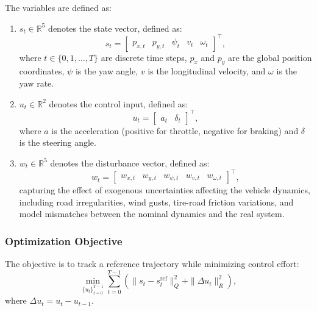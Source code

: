 \documentclass[pdflatex,sn-mathphys,Numbered]{sn-jnl}
\numberwithin{equation}{section}
\begin{document}
	The variables are defined as:
	\begin{enumerate}
		\item[i)] \( s_t \in \mathbb{R}^5 \) denotes the state vector, defined as:
		\begin{equation}
			s_t = \begin{bmatrix} p_{x,t} & p_{y,t} & \psi_t & v_t & \omega_t \end{bmatrix}^\top,
			\label{equ:sec2_state_vector}
		\end{equation}
		where \(t \in \{0,1,\dots,T\}\) are discrete time steps, \( p_x \) and \( p_y \) are the global position coordinates, \( \psi \) is the yaw angle, \( v \) is the longitudinal velocity, and \( \omega \) is the yaw rate.
		
		\item[ii)] \( u_t \in \mathbb{R}^2 \) denotes the control input, defined as:
		\begin{equation}
			u_t = \begin{bmatrix} a_t & \delta_t \end{bmatrix}^\top,
			\label{equ:sec2_control_vector}
		\end{equation}
		where \( a \) is the acceleration (positive for throttle, negative for braking) and \( \delta \) is the steering angle.
		
		\item[iii)] \( w_t \in \mathbb{R}^5 \) denotes the disturbance vector, defined as:
		\begin{equation}
			w_t = \begin{bmatrix} w_{x,t} & w_{y,t} & w_{\psi,t} & w_{v,t} & w_{\omega,t} \end{bmatrix}^\top,
			\label{equ:sec2_disturbance_vector}
		\end{equation}
		capturing the effect of exogenous uncertainties affecting the vehicle dynamics, including road irregularities, wind gusts, tire-road friction variations, and model mismatches between the nominal dynamics and the real system.
	\end{enumerate}
	
	\subsubsection{Optimization Objective}
	The objective is to track a reference trajectory while minimizing control effort:
	\begin{equation}
		\min_{\{u_t\}_{t=0}^{T-1}} \sum_{t=0}^{T-1} \left( \| s_t - s_t^{\text{ref}} \|_Q^2 + \|\Delta u_t\|_R^2 \right),
		\label{equ:sec2_tracking_objective}
	\end{equation}
	where \( \Delta u_t = u_t - u_{t-1} \).
	
\end{document}

